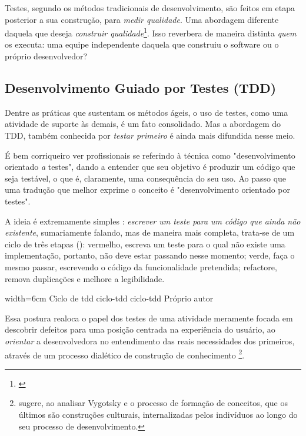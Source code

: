     Testes, segundo os métodos tradicionais de desenvolvimento, são feitos em etapa posterior a sua construção, para \emph{medir qualidade}. Uma abordagem diferente daquela que deseja \emph{construir qualidade}\footnote{ \cite[pág. 7]{FarcicGarcia2015}}. Isso reverbera de maneira distinta \emph{quem} os executa: uma equipe independente daquela que construiu o software ou o próprio desenvolvedor?

    \subsection{Desenvolvimento Guiado por Testes (TDD)}

      Dentre as práticas que sustentam os métodos ágeis, o uso de testes, como uma atividade de suporte às demais, é um fato consolidado. Mas a abordagem do TDD, também conhecida por \emph{testar primeiro} é ainda mais difundida nesse  meio.

      É bem corriqueiro ver profissionais se referindo à  técnica como "desenvolvimento orientado \emph{a} testes", dando a entender que seu objetivo é produzir um código que seja testável, o que é, claramente, uma consequência do seu uso. Ao passo que uma tradução que melhor exprime o conceito é "desenvolvimento orientado {por} testes".

      A ideia é extremamente simples \cite[p.1]{FreemanPryce2009}: \emph{escrever um teste para um código que ainda não existente}, sumariamente falando, mas de maneira mais completa, trata-se de um ciclo de três etapas\cite[pág. x] {Beck2003} (): vermelho,  escreva um teste para o qual não existe uma implementação, portanto, não deve estar passando nesse momento; verde, faça o mesmo passar, escrevendo o código da funcionalidade pretendida; refactore, remova duplicações e melhore a legibilidade.

      \imagem
        {width=6cm}
        {Ciclo de tdd}
        {ciclo-tdd}
        {ciclo-tdd}
        {Próprio autor\footnotemark}

      Essa postura realoca o papel dos testes de uma atividade meramente focada em descobrir defeitos para uma posição centrada na experiência do usuário, ao  \emph{orientar} a desenvolvedora no entendimento das reais necessidades dos primeiros, através de um processo dialético de construção de conhecimento \footnote{ sugere, ao analisar Vygotsky e o processo de formação de conceitos, que os últimos são construções culturais, internalizadas pelos indivíduos ao longo do seu processo de desenvolvimento.}.

